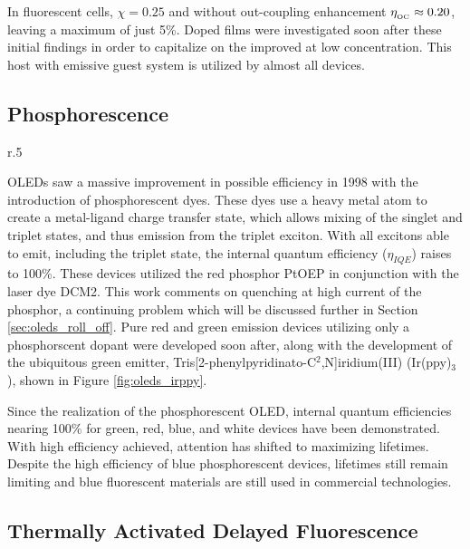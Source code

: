 \documentclass[../thesis.tex]{subfiles}
\begin{document}
In fluorescent cells, $\chi=0.25$ and without out-coupling enhancement $\eta_{_\text{\tiny OC}} \approx 0.20$, leaving a maximum \eqe of just 5\%.
Doped films were investigated soon after these initial findings in order to capitalize on the improved \pl at low concentration.\supercite{Tang1989a}
This host with emissive guest system is utilized by almost all devices.


\subsection{Phosphorescence}
\begin{wrapfigure}{r}{.5\textwidth}
\caption{Molecular structure of the green phosphor, Ir(ppy)$_3$}
\label{fig:oleds_irppy}
\end{wrapfigure}
OLEDs saw a massive improvement in possible efficiency in 1998 with the introduction of phosphorescent dyes.\supercite{Baldo1998a}
These dyes use a heavy metal atom to create a metal-ligand charge transfer state, which allows mixing of the singlet and triplet states, and thus emission from the triplet exciton.
With all excitons able to emit, including the triplet state, the internal quantum efficiency ($\eta_{IQE}$) raises to 100\%.
These devices utilized the red phosphor PtOEP in conjunction with the laser dye DCM2.
This work comments on quenching at high current of the phosphor, a continuing problem which will be discussed further in Section \ref{sec:oleds_roll_off}.\supercite{Reineke2007,Hershey2016}
Pure red and green emission devices utilizing only a phosphorscent dopant were developed soon after, along with the development of the ubiquitous green emitter, Tris[2-phenylpyridinato-C$^2$,N]iridium(III) (Ir(ppy)$_3$), shown in Figure \ref{fig:oleds_irppy}.\supercite{OBrien1999a,Adachi2000}


Since the realization of the phosphorescent OLED, internal quantum efficiencies nearing 100\% for green, red, blue, and white devices have been demonstrated.\supercite{Su2008a,Erickson2010}
With high efficiency achieved, attention has shifted to maximizing lifetimes.\supercite{Scholz2008}
Despite the high efficiency of blue phosphorescent devices, lifetimes still remain limiting and blue fluorescent materials are still used in commercial technologies.


\subsection{Thermally Activated Delayed Fluorescence}
\end{document}
